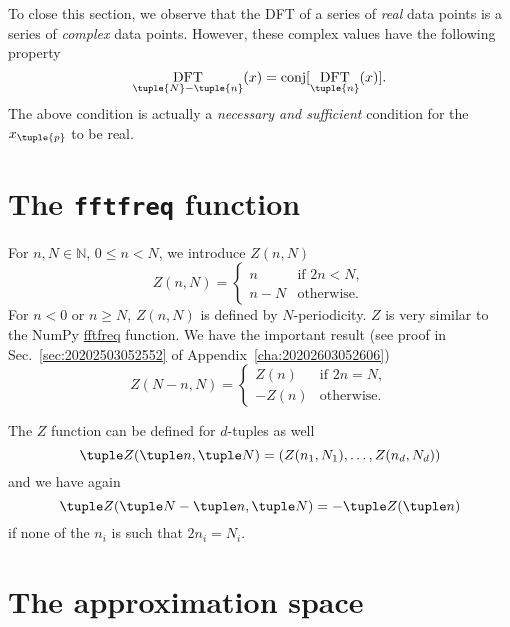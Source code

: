 \documentclass[draft, appendixprefix=true, chapterprefix=true, fontsize=12pt, numbers=noendperiod]{scrbook}
\DeclareMathOperator{\conj}{conj}
\DeclareMathOperator{\dft}{DFT}
\newcommand{\naturals}{\mathbb N}
\begin{document}
To close this section, we observe that the DFT of a series of \emph{real} data
points is a series of \emph{complex} data points. However, these complex values
have the following property
\begin{equation}
  \dft_{\tuple{N}-\tuple{n}}(x)=\conj[\dft_{\tuple{n}}(x)].
\end{equation}
The above condition is actually a \emph{necessary and sufficient} condition for
the \(x_{\tuple{p}}\) to be real.

\section{The \texttt{fftfreq} function}

For \(n, N\in\naturals\), \(0\leq n<N\), we introduce \(Z(n, N)\)
\begin{equation}
  Z(n, N)=
  \begin{cases}
    n & \text{if }2n<N,\\
    n-N & \text{otherwise.}
  \end{cases}
\end{equation}
For \(n<0\) or \(n\geq N\), \(Z(n, N)\) is defined by \(N\)-periodicity. \(Z\)
is very similar to the NumPy
\href{https://numpy.org/doc/1.18/reference/generated/numpy.fft.fftfreq.html#numpy.fft.fftfreq}{fftfreq}
function. We have the important result (see proof in
Sec.~\ref{sec:20202503052552} of Appendix~\ref{cha:20202603052606})
\begin{equation}
  \label{eq:20202503052504}
  Z(N-n, N)=
  \begin{cases}
    Z(n) & \text{if }2n=N,\\
    -Z(n) & \text{otherwise.}
  \end{cases}
\end{equation}

The \(Z\) function can be defined for \(d\)-tuples as well
\begin{equation}
  \tuple Z(\tuple n, \tuple N)=(Z(n_1, N_1), \ldots, Z(n_d, N_d))
\end{equation}
and we have again
\begin{equation}
  \tuple Z(\tuple N-\tuple n, \tuple N)=-\tuple Z(\tuple n)
\end{equation}
if none of the \(n_i\) is such that \(2n_i=N_i\).

\section{The approximation space}
\end{document}
